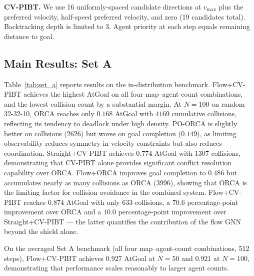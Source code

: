 \textbf{CV-PIBT.} We use 16 uniformly-spaced candidate directions at $v_{\max}$ plus the preferred velocity, half-speed preferred velocity, and zero (19 candidates total). Backtracking depth is limited to 3. Agent priority at each step equals remaining distance to goal.

\subsection{Main Results: Set A}

Table~\ref{tab:set_a} reports results on the in-distribution benchmark. Flow+CV-PIBT achieves the highest AtGoal on all four map--agent-count combinations, and the lowest collision count by a substantial margin. At $N{=}100$ on random-32-32-10, ORCA reaches only $0.168$ AtGoal with $4169$ cumulative collisions, reflecting its tendency to deadlock under high density. PO-ORCA is slightly better on collisions ($2626$) but worse on goal completion ($0.149$), as limiting observability reduces symmetry in velocity constraints but also reduces coordination. Straight+CV-PIBT achieves $0.774$ AtGoal with $1307$ collisions, demonstrating that CV-PIBT alone provides significant conflict resolution capability over ORCA. Flow+ORCA improves goal completion to $0.486$ but accumulates nearly as many collisions as ORCA ($3996$), showing that ORCA is the limiting factor for collision avoidance in the combined system. Flow+CV-PIBT reaches $0.874$ AtGoal with only $633$ collisions, a $70.6$ percentage-point improvement over ORCA and a $10.0$ percentage-point improvement over Straight+CV-PIBT --- the latter quantifies the contribution of the flow GNN beyond the shield alone.

On the averaged Set A benchmark (all four map--agent-count combinations, 512 steps), Flow+CV-PIBT achieves $0.927$ AtGoal at $N{=}50$ and $0.921$ at $N{=}100$, demonstrating that performance scales reasonably to larger agent counts.

